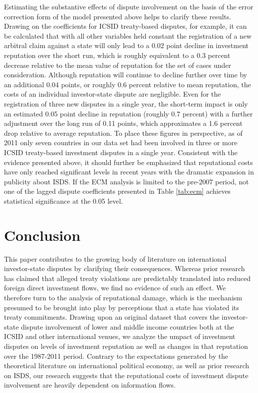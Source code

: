 \documentclass[12pt,onesided]{amsart}
\begin{document}

Estimating the substantive effects of dispute involvement on the basis of the error correction form of the model presented above helps to clarify these results. Drawing on the coefficients for ICSID treaty-based disputes, for example, it can be calculated that with all other variables held constant the registration of a new arbitral claim against a state will only lead to a 0.02 point decline in investment reputation over the short run, which is roughly equivalent to a 0.3 percent decrease relative to the mean value of reputation for the set of cases under consideration. Although reputation will continue to decline further over time by an additional 0.04 points, or roughly 0.6 percent relative to mean reputation, the costs of an individual investor-state dispute are negligible. Even for the registration of three new disputes in a single year, the short-term impact is only an estimated 0.05 point decline in reputation (roughly 0.7 percent) with a further adjustment over the long run of 0.11 points, which approximates a 1.6 percent drop relative to average reputation. To place these figures in perspective, as of 2011 only seven countries in our data set had been involved in three or more ICSID treaty-based investment disputes in a single year. Consistent with the evidence presented above, it should further be emphasized that reputational costs have only reached significant levels in recent years with the dramatic expansion in publicity about ISDS. If the ECM analysis is limited to the pre-2007 period, not one of the lagged dispute coefficients presented in Table \ref{tab:ecm} achieves statistical significance at the 0.05 level. 

\section*{Conclusion}

This paper contributes to the growing body of literature on international investor-state disputes by clarifying their consequences. Whereas prior research has claimed that alleged treaty violations are predictably translated into reduced foreign direct investment flows, we find no evidence of such an effect. We therefore turn to the analysis of reputational damage, which is the mechanism presumed to be brought into play by perceptions that a state has violated its treaty commitments. Drawing upon an original dataset that covers the investor-state dispute involvement of lower and middle income countries both at the ICSID and other international venues, we analyze the umpact of investment disputes on levels of investment reputation as well as changes in that reputation over the 1987-2011 period. Contrary to the expectations generated by the theoretical literature on international political economy, as well as prior research on ISDS, our research suggests that the reputational costs of investment dispute involvement are heavily dependent on information flows. 
\end{document}
